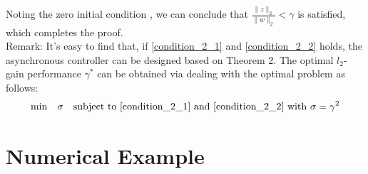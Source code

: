 \documentclass[conference]{IEEEtran}
\begin{document}
Noting the zero initial condition , we can conclude that $\frac{\|z\|_{2}}{\|w\|_2}<\gamma $ is satisfied, which completes the proof. \\
Remark: It's easy to find that, if \eqref{condition_2_1} and \eqref{condition_2_2} holds, the asynchronous controller can be designed based on Theorem 2. The optimal $l_2$-gain performance $\gamma^{*}$ can be obtained via dealing with the optimal problem as follows: \\ 
\begin{equation}
	\mathrm{min}\quad \sigma \quad \mathrm{subject \ to} \ \eqref{condition_2_1} \ \mathrm{and} \ \eqref{condition_2_2} \ \mathrm{with} \ \sigma=\gamma^{2} 
\end{equation}

\section{Numerical Example}
\end{document}
